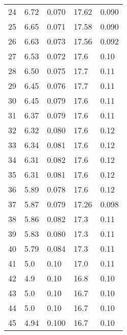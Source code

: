 \begin{table}
\begin{tabular}{c|ll|ll}
24 & 6.72 & 0.070 & 17.62 & 0.090 \\
25 & 6.65 & 0.071 & 17.58 & 0.090 \\
26 & 6.63 & 0.073 & 17.56 & 0.092 \\
27 & 6.53 & 0.072 & 17.6 & 0.10 \\
28 & 6.50 & 0.075 & 17.7 & 0.11 \\
29 & 6.45 & 0.076 & 17.7 & 0.11 \\
30 & 6.45 & 0.079 & 17.6 & 0.11 \\
31 & 6.37 & 0.079 & 17.6 & 0.11 \\
32 & 6.32 & 0.080 & 17.6 & 0.12 \\
33 & 6.34 & 0.081 & 17.6 & 0.12 \\
34 & 6.31 & 0.082 & 17.6 & 0.12 \\
35 & 6.31 & 0.081 & 17.6 & 0.12 \\
36 & 5.89 & 0.078 & 17.6 & 0.12 \\
37 & 5.87 & 0.079 & 17.26 & 0.098 \\
38 & 5.86 & 0.082 & 17.3 & 0.11 \\
39 & 5.83 & 0.080 & 17.3 & 0.11 \\
40 & 5.79 & 0.084 & 17.3 & 0.11 \\
41 & 5.0 & 0.10 & 17.0 & 0.11 \\
42 & 4.9 & 0.10 & 16.8 & 0.10 \\
43 & 5.0 & 0.10 & 16.7 & 0.10 \\
44 & 5.0 & 0.10 & 16.7 & 0.10 \\
45 & 4.94 & 0.100 & 16.7 & 0.10 \\
               \hline
        \end{tabular}
    \end{table}
    \clearpage

